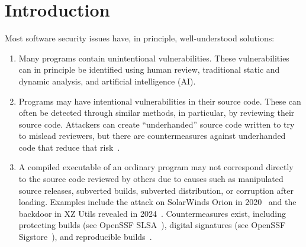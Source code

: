 


\maketitle

\raggedbottom

\setlength{\emergencystretch}{2.5em}

\section{Introduction}

Most software security issues have, in principle, well-un\-der\-stood solutions:

\begin{enumerate}
	\item Many programs contain unintentional vulnerabilities. These vulnerabilities can in principle be identified using human review, traditional static and dynamic analysis, and artificial intelligence (AI).
	\item Programs may have intentional vulnerabilities in their source code. These can often be detected through similar methods, in particular, by reviewing their source code. Attackers can create ``underhanded'' source code written to try to mislead reviewers, but there are countermeasures against underhanded code that reduce that risk~\cite{wheeler2020underhanded}.
	\item A compiled executable of an ordinary program may not correspond directly to the source code reviewed by others due to causes such as manipulated source releases, subverted builds, subverted distribution, or corruption after loading. Examples include the attack on SolarWinds Orion in 2020~\cite{wheeler2021preventingsolarwinds} and the backdoor in XZ Utils revealed in 2024~\cite{akamai2024xzutils}. Countermeasures exist, including protecting builds (see OpenSSF SLSA~\cite{openssfslsa}), digital signatures (see OpenSSF Sigstore~\cite{openssfsigstore}), and reproducible builds~\cite{reproduciblebuilds}.
\end{enumerate}


